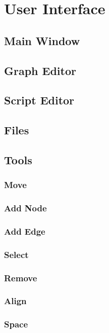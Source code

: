 \chapter{User Interface}
\section{Main Window}
\section{Graph Editor}
\section{Script Editor}
\section{Files}
\section{Tools}
\subsection{Move}
\subsection{Add Node}
\subsection{Add Edge}
\subsection{Select}
\subsection{Remove}
\subsection{Align}
\subsection{Space}